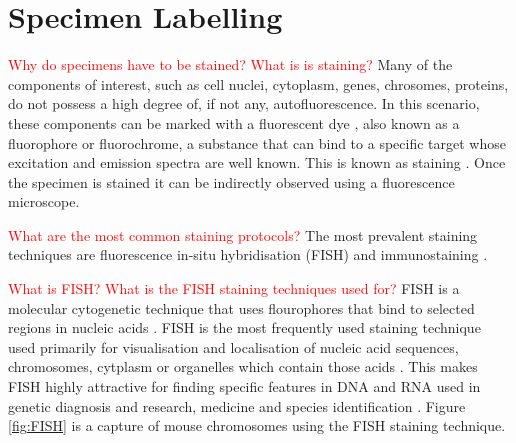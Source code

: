 \section{Specimen Labelling}
\label{sec:SpecimenLabelling}

\textcolor{red}{Why do specimens have to be stained? What is is staining?}
Many of the components of interest, such as cell nuclei, cytoplasm, genes, chrosomes, proteins, do not possess a high degree of, if not any,  autofluorescence. 
In this scenario, these components can be marked with a fluorescent dye \citep{Tsien1998}, also known as a fluorophore or fluorochrome, a substance that can bind to a specific target whose excitation and emission spectra are well known. 
This is known as staining \citep{Danek2012,Hubeny2008,Dobrucki2013}. 
Once the specimen is stained it can be indirectly observed using a fluorescence microscope.

\textcolor{red}{What are the most common staining protocols?}
The most prevalent staining techniques are fluorescence in-situ hybridisation (FISH) and immunostaining \citep{Danek2012,Fatima2008,Kozubek2001_2,Theodosiou2007}.

\begin{definition}
	\textcolor{red}{What is FISH?	What is the FISH staining techniques used for?}
	FISH is a molecular cytogenetic technique that uses flourophores that bind to selected regions in nucleic acids \citep{Danek2012,Fatima2008}.
	FISH is the most frequently used staining technique used primarily for visualisation and localisation of nucleic acid sequences, chromosomes, cytplasm or organelles which contain those acids \citep{Hubeny2008}.
	This makes FISH highly attractive for finding specific features in DNA and RNA used in genetic diagnosis and research, medicine and species identification \citep{Amann2008,Fatima2008}.
	Figure \ref{fig:FISH} is a capture of mouse chromosomes using the FISH staining technique.
\end{definition}

